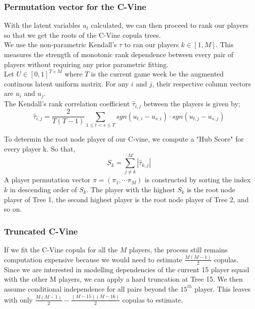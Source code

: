 \documentclass[12pt,oneside,a4paper]{book}
\theoremstyle{definition}
\theoremstyle{remark}
\begin{document}
				\subsubsection{Permutation vector for the C-Vine}
				With the latent variables $u_t$ calculated, we can then proceed to rank our players so that we get the roots of the C-Vine copula trees.\\
				We use the non-parametric Kendall's $\tau$ to ran our players $k \in [1,M]$. This measures the strength of monotonic rank dependence between every pair of players without requiring any prior parametric fitting.\\
				Let $U\in \left[0,1\right]^{T \times M}$ where $T$ is the current game week be the augmented continous latent uniform matrix. For any $i$ and $j$, their respective column vectors are $u_i$ and $u_j$.\\
				The Kendall's rank correlation coefficient $\hat{\tau}_{i,j}$ between the players is given by;
				\begin{equation}\label{Eq:kendall_tau}
					\hat{\tau}_{i,j} = \frac{2}{T\left(T-1\right)}\sum_{1\leqslant t < s \leqslant T}sgn\left(u_{t,i} - u_{s,i}\right)\cdot sgn\left(u_{t,j} - u_{s,j}\right)
				\end{equation}

				To determin the root node player of our C-vine, we compute a "Hub Score" for every player k. So that,
				\begin{equation}\label{Eq:hub_score}
					S_{k} = \sum_{j \neq k}^{M} \left|\hat{\tau}_{k,j} \right|
				\end{equation}
				A player permutation vector $\pi = \left(\pi_1, \cdots \pi_{M}\right)$  is constructed by sorting the index $k$ in descending order of $S_k$. The player with the highest $S_k$ is the root node player of Tree 1, the second highest player is the root node player of Tree 2, and so on.

				\subsubsection{Truncated C-Vine}
				If we fit the C-Vine copula for all the $M$ players, the process still remains computation expensive because we would need to estimate $\frac{M\left(M-1\right)}{2}$ copulas.
				Since we are interested in modelling dependencies of the current 15 player squad with the other M players, we can apply a hard truncation at Tree 15. We then assume conditional independence for all pairs beyond the $15^{th}$ player. This leaves with only $\frac{M\left(M-1\right)}{2} - \frac{\left(M-15\right) \left(M-16\right)}{2}$ copulas to estimate.
\end{document}
